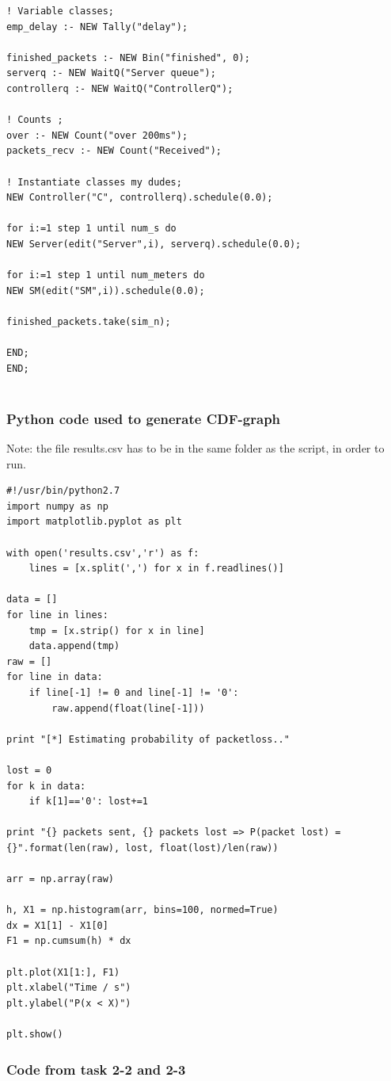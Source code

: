 \documentclass[11pt]{article}
\begin{document}
\begin{lstlisting}
! Variable classes;
emp_delay :- NEW Tally("delay");

finished_packets :- NEW Bin("finished", 0);
serverq :- NEW WaitQ("Server queue"); 
controllerq :- NEW WaitQ("ControllerQ");

! Counts ;
over :- NEW Count("over 200ms");
packets_recv :- NEW Count("Received");

! Instantiate classes my dudes;
NEW Controller("C", controllerq).schedule(0.0);

for i:=1 step 1 until num_s do
NEW Server(edit("Server",i), serverq).schedule(0.0);

for i:=1 step 1 until num_meters do
NEW SM(edit("SM",i)).schedule(0.0);

finished_packets.take(sim_n);

END;
END;


\end{lstlisting}

\subsubsection{Python code used to generate CDF-graph}
Note: the file results.csv has to be in the same folder as the script, in order to run.
\begin{lstlisting}
#!/usr/bin/python2.7
import numpy as np
import matplotlib.pyplot as plt

with open('results.csv','r') as f:
	lines = [x.split(',') for x in f.readlines()]

data = []
for line in lines:
	tmp = [x.strip() for x in line]
	data.append(tmp)
raw = []
for line in data:
	if line[-1] != 0 and line[-1] != '0':
		raw.append(float(line[-1]))

print "[*] Estimating probability of packetloss.."

lost = 0
for k in data:
	if k[1]=='0': lost+=1

print "{} packets sent, {} packets lost => P(packet lost) = {}".format(len(raw), lost, float(lost)/len(raw))

arr = np.array(raw)

h, X1 = np.histogram(arr, bins=100, normed=True)
dx = X1[1] - X1[0]
F1 = np.cumsum(h) * dx

plt.plot(X1[1:], F1)
plt.xlabel("Time / s")
plt.ylabel("P(x < X)")

plt.show()
\end{lstlisting}

\subsubsection{Code from task 2-2 and 2-3}
\end{document}
